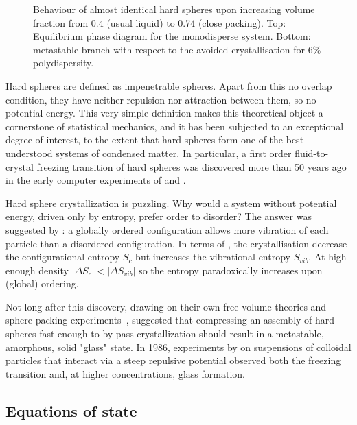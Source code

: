 \begin{figure}
	\centering
	\def\svgwidth{0.9\textwidth}
   	
	
	\caption{Behaviour of almost identical hard spheres upon increasing volume fraction from 0.4 (usual liquid) to 0.74 (close packing). Top: Equilibrium phase diagram for the monodisperse system. Bottom: metastable branch with respect to the avoided crystallisation for $6\%$ polydispersity.}
	\label{fig:HS_phase_diagram}
\end{figure}

Hard spheres are defined as impenetrable spheres. Apart from this no overlap condition, they have neither repulsion nor attraction between them, so no potential energy. This very simple definition makes this theoretical object a cornerstone of statistical mechanics, and it has been subjected to an exceptional degree of interest, to the extent that hard spheres form one of the best understood systems of condensed matter. In particular, a first order fluid-to-crystal freezing transition of hard spheres was discovered more than 50 years ago in the early computer experiments of \citet{wood1957} and \citet{alder1957}.

Hard sphere crystallization is puzzling. Why would a system without potential energy, driven only by entropy, prefer order to disorder? The answer was suggested by \citet{hoover1958}: a globally ordered configuration allows more vibration of each particle than a disordered configuration. In terms of , the crystallisation decrease the configurational entropy $S_c$ but increases the vibrational entropy $S_{vib}$. At high enough density $|\Delta S_c|<|\Delta S_{vib}|$ so the entropy paradoxically increases upon (global) ordering.

Not long after this discovery, drawing on their own free-volume theories and sphere packing experiments~\citep{Scott1960, Bernal1960}, \citet{Cohen1959, Cohen1964} suggested that compressing an assembly of hard spheres fast enough to by-pass crystallization should result in a metastable, amorphous, solid "glass" state. In 1986, experiments by \citet{pusey1986} on suspensions of colloidal particles that interact via a steep repulsive potential observed both the freezing transition and, at higher concentrations, glass formation.

\subsection{Equations of state}
\label{sec:eos}


